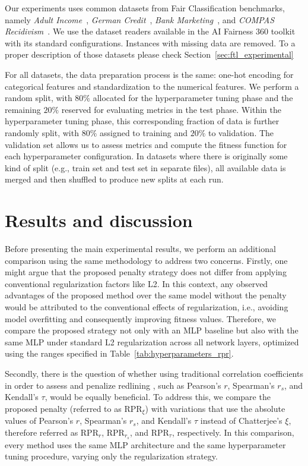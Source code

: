 Our experiments uses common datasets from Fair Classification benchmarks, namely \textit{Adult Income}~\citep{misc_adult_2}, \textit{German Credit}~\citep{misc_statlog_(german_credit_data)_144}, \textit{Bank Marketing}~\citep{misc_bank_marketing_222}, and \textit{COMPAS Recidivism}~\citep{misc_compas}. We use the dataset readers available in the AI Fairness 360 toolkit~\citep{aif360-oct-2018} with its standard configurations. Instances with missing data are removed. To a proper description of those datasets please check Section~\ref{sec:ftl_experimental}

For all datasets, the data preparation process is the same: one-hot encoding for categorical features and standardization to the numerical features. We perform a random split, with $80\%$ allocated for the hyperparameter tuning phase and the remaining $20\%$ reserved for evaluating metrics in the test phase. Within the hyperparameter tuning phase, this corresponding fraction of data is further randomly split, with $80\%$ assigned to training and $20\%$ to validation. The validation set allows us to assess metrics and compute the fitness function for each hyperparameter configuration. In datasets where there is originally some kind of split (e.g., train set and test set in separate files), all available data is merged and then shuffled to produce new splits at each run.

\section{Results and discussion} \label{sec:rpr_results}

Before presenting the main experimental results, we perform an additional comparison using the same methodology to address two concerns. Firstly, one might argue that the proposed penalty strategy does not differ from applying conventional regularization factors like L2. In this context, any observed advantages of the proposed method over the same model without the penalty would be attributed to the conventional effects of regularization, i.e., avoiding model overfitting and consequently improving fitness values. Therefore, we compare the proposed strategy not only with an MLP baseline but also with the same MLP under standard L2 regularization across all network layers, optimized using the ranges specified in Table~\ref{tab:hyperparameters_rpr}.

Secondly, there is the question of whether using traditional correlation coefficients in order to assess and penalize redlining , such as Pearson's $r$, Spearman's $r_s$, and Kendall's $\tau$, would be equally beneficial. To address this, we compare the proposed penalty (referred to as RPR$_\xi$) with variations that use the absolute values of Pearson's $r$, Spearman's $r_s$, and Kendall's $\tau$ instead of Chatterjee's $\xi$, therefore referred as RPR$_r$, RPR${_{r_s}}$, and RPR$_\tau$, respectively. In this comparison, every method uses the same MLP architecture and the same hyperparameter tuning procedure, varying only the regularization strategy.

